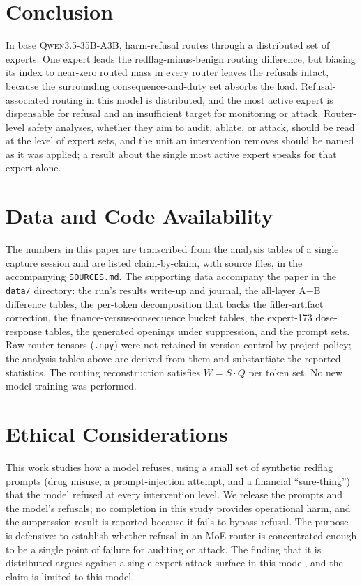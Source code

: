 \documentclass[10pt,twocolumn]{article}
\begin{document}
\section{Conclusion}
\label{sec:conc}

In base \textsc{Qwen3.5-35B-A3B}, harm-refusal routes through a distributed
set of experts. One expert leads the redflag-minus-benign routing difference,
but biasing its index to near-zero routed mass in every router leaves the
refusals intact, because the surrounding consequence-and-duty set absorbs the
load. Refusal-associated
routing in this model is distributed, and the most active expert is
dispensable for refusal and an insufficient target for monitoring or attack.
Router-level safety analyses, whether they aim to audit, ablate, or attack,
should be read at the level of expert sets, and the unit an intervention
removes should be named as it was applied; a result about the single most
active expert speaks for that expert alone.

\section*{Data and Code Availability}

The numbers in this paper are transcribed from the analysis tables of a
single capture session and are listed claim-by-claim, with source files, in
the accompanying \texttt{SOURCES.md}. The supporting data accompany the paper
in the \texttt{data/} directory: the run's results write-up and journal, the
all-layer A$-$B difference tables, the per-token decomposition that backs the
filler-artifact correction, the finance-versus-consequence bucket tables, the
expert-173 dose-response tables, the generated openings under suppression,
and the prompt sets. Raw router tensors (\texttt{.npy}) were not retained in
version control by project policy; the analysis tables above are derived from
them and substantiate the reported statistics. The routing reconstruction
satisfies $W=S\cdot Q$ per token set. No new model training was performed.

\section*{Ethical Considerations}

This work studies how a model refuses, using a small set of synthetic redflag
prompts (drug misuse, a prompt-injection attempt, and a financial
``sure-thing'') that the model refused at every intervention level. We
release the prompts and the model's refusals; no completion in this study
provides operational harm, and the suppression result is reported because it
fails to bypass refusal. The purpose is defensive: to establish whether
refusal in an MoE router is concentrated enough to be a single point of
failure for auditing or attack. The finding that it is distributed argues
against a single-expert attack surface in this model, and the claim is
limited to this model.
\end{document}
